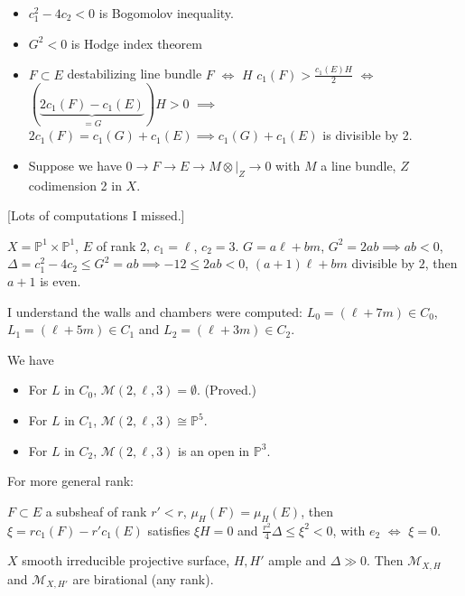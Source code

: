 \begin{remark}
\label{remark-remarks}
\begin{itemize}
\item $c_1^2-4c_2<0$ is Bogomolov inequality.
\item  $G^2<0$ is Hodge index theorem
\item $F \subset E$ destabilizing line bundle $F$ $\iff$ $H$  
$c_1(F)>\frac{c_1(E)H}{2}$ $\iff$ $(\underbrace{2c_1(F)-c_1(E)}_{=G})H>0$
$\implies$ $2c_1(F)=c_1(G)+c_1(E) \implies c_1(G)+c_1(E)$ is divisible by 2.
\item Suppose we have $0 \to F \to E \to M \otimes |_{Z}\to 0$ with $M$ a line
bundle, $Z$ codimension 2 in $X$.
\end{itemize}
\end{remark}

[Lots of computations I missed.]

\begin{exercise}
\label{exercise-P1timesP1}
$X=\mathbb{P}^1\times \mathbb{P}^1$, $E$ of rank 2, $c_1=\ell$, $c_2=3$.
$G=a\ell+bm$, $G^2=2ab \implies ab<0$, $\Delta=c_1^2-4c_2\leq G^2=ab\implies
-12\leq 2ab<0$, $(a+1)\ell+bm$ divisible by $2$, then $a+1$ is even.

I understand the walls and chambers were computed:
$L_0=(\ell+7m)\in C_0$,
$L_1=(\ell+5m) \in C_1$ and $L_2=(\ell+3m) \in C_2$.

We have
 \begin{itemize}
\item For $L$ in  $C_0$, $\mathcal{M}(2,\ell,3)=\emptyset$. (Proved.)
\item For $L$ in $C_1$, $\mathcal{M}(2,\ell,3)\cong \mathbb{P}^5$.
\item For $L$ in $C_2$, $\mathcal{M}(2,\ell,3)$ is an open in $\mathbb{P}^3$.
\end{itemize}
\end{exercise}

For more general rank:

\begin{theorem}
\label{theorem-general-rank}
$F \subset E$ a subsheaf of rank $r'<r$, $\mu_H(F)=\mu_H(E)$, then 
$\xi=rc_1(F)-r'c_1(E)$ satisfies $\xi H=0$ and 
$\frac{r^2}{4}\Delta \leq \xi^2<0$, with $e_2$ $\iff$ $\xi=0$.
\end{theorem}

\begin{theorem}
\label{theorem-smooth-irreducible-projective-surface-moduli-are-birrational}
$X$ smooth irreducible projective surface, $H,H'$ ample and $\Delta\gg 0$. Then
$\mathcal{M}_{X,H}$ and $\mathcal{M}_{X,H'}$ are birational (any rank).
\end{theorem}

